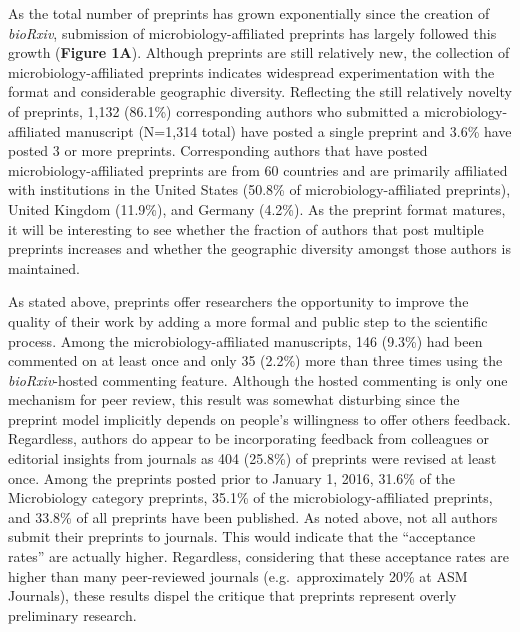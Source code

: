 \documentclass[11pt,]{article}
\begin{document}
As the total number of preprints has grown exponentially since the
creation of \emph{bioRxiv}, submission of microbiology-affiliated
preprints has largely followed this growth (\textbf{Figure 1A}).
Although preprints are still relatively new, the collection of
microbiology-affiliated preprints indicates widespread experimentation
with the format and considerable geographic diversity. Reflecting the
still relatively novelty of preprints, 1,132 (86.1\%) corresponding
authors who submitted a microbiology-affiliated manuscript (N=1,314
total) have posted a single preprint and 3.6\% have posted 3 or more
preprints. Corresponding authors that have posted
microbiology-affiliated preprints are from 60 countries and are
primarily affiliated with institutions in the United States (50.8\% of
microbiology-affiliated preprints), United Kingdom (11.9\%), and Germany
(4.2\%). As the preprint format matures, it will be interesting to see
whether the fraction of authors that post multiple preprints increases
and whether the geographic diversity amongst those authors is
maintained.

As stated above, preprints offer researchers the opportunity to improve
the quality of their work by adding a more formal and public step to the
scientific process. Among the microbiology-affiliated manuscripts, 146
(9.3\%) had been commented on at least once and only 35 (2.2\%) more
than three times using the \emph{bioRxiv}-hosted commenting feature.
Although the hosted commenting is only one mechanism for peer review,
this result was somewhat disturbing since the preprint model implicitly
depends on people's willingness to offer others feedback. Regardless,
authors do appear to be incorporating feedback from colleagues or
editorial insights from journals as 404 (25.8\%) of preprints were
revised at least once. Among the preprints posted prior to January 1,
2016, 31.6\% of the Microbiology category preprints, 35.1\% of the
microbiology-affiliated preprints, and 33.8\% of all preprints have been
published. As noted above, not all authors submit their preprints to
journals. This would indicate that the ``acceptance rates'' are actually
higher. Regardless, considering that these acceptance rates are higher
than many peer-reviewed journals (e.g.~approximately 20\% at ASM
Journals), these results dispel the critique that preprints represent
overly preliminary research.
\end{document}
